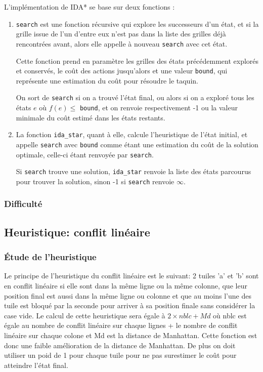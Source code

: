 \documentclass[a4paper, 12pt]{article}
\begin{document}
    L'implémentation de IDA* se base sur deux fonctions :
    \begin{enumerate}
        \item \lstinline{search} est une fonction récursive qui explore les successeurs d'un état, et si la grille issue de l'un d'entre eux n'est pas dans la liste des grilles déjà rencontrées avant, alors elle appelle à nouveau \lstinline{search} avec cet état.
        
        Cette fonction prend en paramètre les grilles des états précédemment explorés et conservés, le coût des actions jusqu'alors et une valeur \lstinline{bound}, qui représente une estimation du coût pour résoudre le taquin.

        On sort de \lstinline{search} si on a trouvé l'état final, ou alors si on a exploré tous les états $e$ où $f(e) \leq $ \lstinline{bound}, et on renvoie respectivement -1 ou la valeur minimale du coût estimé dans les états restants.

        \item La fonction \lstinline{ida_star}, quant à elle, calcule l'heuristique de l'état initial, et appelle \lstinline{search} avec \lstinline{bound} comme étant une estimation du coût de la solution optimale, celle-ci étant renvoyée par \lstinline{search}.
        
        Si \lstinline{search} trouve une solution, \lstinline{ida_star} renvoie la liste des états parcourus pour trouver la solution, sinon -1 si \lstinline{search} renvoie $\infty$.
    \end{enumerate}
    
    \subsubsection{Difficulté}
    
    \subsection{Heuristique: conflit linéaire}
    
    
    \subsubsection{Étude de l'heuristique}
    
    Le principe de l'heuristique du conflit linéaire est le suivant: 2 tuiles 'a' et 'b' sont en conflit linéaire si elle sont dans la même ligne ou la même colonne, que leur position final est aussi dans la même ligne ou colonne et que au moins l'une des tuile est bloqué par la seconde pour arriver à sa position finale sans considérer la case vide.
    Le calcul de cette heuristique sera égale à $2 \times nblc + Md$ où nblc est égale au nombre de conflit linéaire sur chaque lignes + le nombre de conflit linéaire sur chaque colone et Md est la distance de Manhattan. Cette fonction est donc une faible amélioration de la distance de Manhattan. De plus on doit utiliser un poid de 1 pour chaque tuile pour ne pas surestimer le coût pour atteindre l'état final.
    
\end{document}
